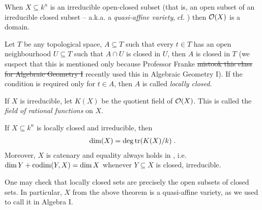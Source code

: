 \documentclass[a4paper,parskip=full,numbers=enddot]{scrreprt}
\begin{document}
\begin{rem}
    When $X\subseteq k^n$ is an irreducible open-closed subset (that is, an open subset of an irreducible closed subset -- a.k.a. a \emph{quasi-affine variety}, cf. \cite[Definition~2.2.1]{alg1}) then $\mathcal{O}(X)$ is a domain. 
\end{rem}
\begin{rem}
    Let $T$ be any topological space, $A\subseteq T$ such that every $t\in T$ has an open neighbourhood $U\subseteq T$ such that $A\cap U$ is closed in $U$, then $A$ is closed in $T$ (we suspect that this is mentioned only because Professor Franke \sout{mistook this class for Algebraic Geometry I} recently used this in Algebraic Geometry I). If the condition is required only for $t\in A$, then $A$ is called \emph{locally closed}.
\end{rem}
If $X$ is irreducible, let $K(X)$ be the quotient field of $\mathcal{O}(X)$. This is called the \emph{field of rational functions} on $X$.
\begin{thm}
	If $X\subseteq k^n$ is locally closed and irreducible, then
	\begin{align*}
		\dim(X) = \deg\operatorname{tr} (K(X)/k)\;.
	\end{align*}
	Moreover, $X$ is catenary and equality always holds in , i.e. $\dim Y +\operatorname{codim}(Y,X) = \dim X$ whenever $Y\subseteq X$ is closed, irreducible.
\end{thm}
One may check that locally closed sets are precisely the open subsets of closed sets. In particular, $X$ from the above theorem is a quasi-affine variety, as we used to call it in Algebra I.
\end{document}
